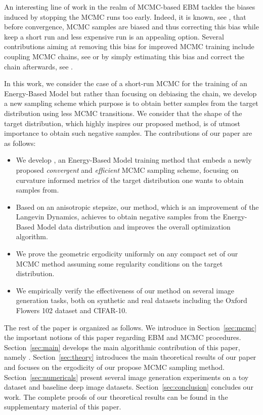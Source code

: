 \documentclass[10pt,twocolumn,letterpaper]{article}
\begin{document}
An interesting line of work in the realm of MCMC-based EBM tackles the biases induced by stopping the MCMC runs too early. 
Indeed, it is known, see \cite{meyn2012markov}, that before convergence, MCMC samples are biased and thus correcting this bias while keep a short run and less expensive run is an appealing option.
Several contributions aiming at removing this bias for improved MCMC training include coupling MCMC chains, see \cite{qiu2019unbiased,jacob2020unbiased} or by simply estimating this bias and correct the chain afterwards, see \cite{du2020improved}.


In this work, we consider the case of a short-run MCMC for the training of an Energy-Based Model but rather than focusing on debiasing the chain, we develop a new sampling scheme which purpose is to obtain better samples from the target distribution using less MCMC transitions.
We consider that the shape of the target distribution, which highly inspires our proposed method, is of utmost importance to obtain such negative samples.
The contributions of our paper are as follows:

\begin{itemize}
\item We develop \algo, an Energy-Based Model training method that embeds a newly proposed \emph{convergent} and \emph{efficient} MCMC sampling scheme, focusing on curvature informed metrics of the target distribution one wants to obtain samples from.
\item Based on an anisotropic stepsize, our method, which is an improvement of the Langevin Dynamics, achieves to obtain negative samples from the Energy-Based Model data distribution and improves the overall optimization algorithm.
\item We prove the geometric ergodicity uniformly on any compact set of our MCMC method assuming some regularity conditions on the target distribution.
\item We empirically verify the effectiveness of our method on several image generation tasks, both on synthetic and real datasets including the Oxford Flowers 102 dataset and CIFAR-10.
\end{itemize}

The rest of the paper is organized as follows.
We introduce in Section~\ref{sec:mcmc} the important notions of this paper regarding EBM and MCMC procedures.
Section~\ref{sec:main} develops the main algorithmic contribution of this paper, namely \algo.
Section~\ref{sec:theory} introduces the main theoretical results of our paper and focuses on the ergodicity of our propose MCMC sampling method.
Section~\ref{sec:numericals} present several image generation experiments on a toy dataset and baseline deep image datasets.
 Section~\ref{sec:conclusion} concludes our work.
The complete proofs of our theoretical results can be found in the supplementary material of this paper.
\end{document}
